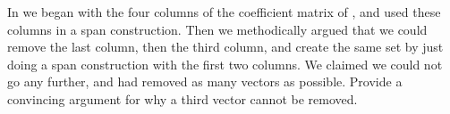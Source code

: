 In  we began with the four columns of the coefficient matrix of , and used these columns in a span construction.  Then we methodically argued that we could remove the last column, then the third column, and create the same set by just doing a span construction with the first two columns.  We claimed we could not go any further, and had removed as many vectors as possible.  Provide a convincing argument for why a third vector cannot be removed.